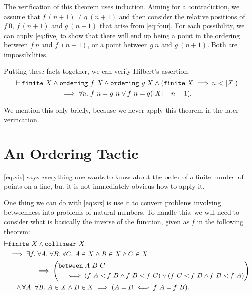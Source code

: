 The verification of this theorem uses induction. Aiming for a contradiction, we assume that $f\ (n+1) \neq g\ (n+1)$ and then consider the relative positions of $f\ 0$, \mbox{$f\ (n+1)$} and $g\ (n+1)$ that arise from \ref{eq:four}. For each possibility, we can apply \ref{eq:five} to show that there will end up being a point in the ordering between $f\ n$ and $f\ (n+1)$, or a point between $g\ n$ and $g\ (n+1)$. Both are impossibilities.

Putting these facts together, we can verify Hilbert's assertion.
\begin{multline*}
  \vdash\texttt{finite}\ X \wedge \texttt{ordering}\ f\ X \wedge \texttt{ordering}\ g\ X \wedge (\texttt{finite}\ X \implies n < |X|)\\
  \implies \forall n.\; f\ n = g\ n \vee f\ n = g (|X| - n - 1).
\end{multline*}

We mention this only briefly, because we never apply this theorem in the later verification.

\section{An Ordering Tactic}
\ref{eq:six} says everything one wants to know about the order of a finite number of points on a line, but it is not immediately obvious how to apply it.

One thing we can do with \ref{eq:six} is use it to convert problems involving betweenness into problems of natural numbers. To handle this, we will need to consider what is basically the inverse of the  function, given as $f$ in the following theorem:
\begin{equation*}
\begin{split}
  \vdash&\texttt{finite}\ X \wedge \texttt{collinear}\ X\\
  &\implies \exists f.\; \forall A.\;\forall B.\;\forall C.\;A \in X \wedge B \in X \wedge C \in X \\
  &\qquad\qquad\implies\left(\begin{aligned}&\texttt{between}\ A\ B\ C \\ &\quad
  \iff (f\ A < f\ B \wedge f\ B < f\ C) \vee (f\ C < f\ B \wedge f\ B < f\ A)\end{aligned}\right)\\
  &\quad\wedge \forall A.\;\forall B.\; A \in X \wedge B \in X \implies (A = B \iff f\ A = f\ B).
\end{split}
\end{equation*}


